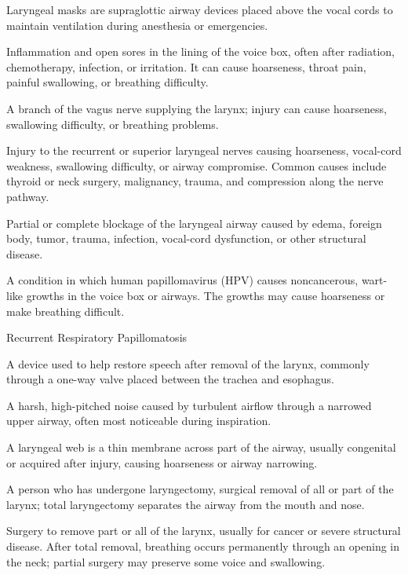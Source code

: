  Laryngeal masks are supraglottic airway devices placed above the vocal cords to maintain ventilation during anesthesia or emergencies.

 Inflammation and open sores in the lining of the voice box, often after radiation, chemotherapy, infection, or irritation. It can cause hoarseness, throat pain, painful swallowing, or breathing difficulty.

 A branch of the vagus nerve supplying the larynx; injury can cause hoarseness, swallowing difficulty, or breathing problems.

 Injury to the recurrent or superior laryngeal nerves causing hoarseness, vocal-cord
weakness, swallowing difficulty, or airway compromise. Common causes include thyroid or
neck surgery, malignancy, trauma, and compression along the nerve pathway.

 Partial or complete blockage of the laryngeal airway caused by edema, foreign body, tumor, trauma, infection, vocal-cord dysfunction, or other structural disease.

 A condition in which human papillomavirus (HPV) causes noncancerous, wart-like growths in the voice box or airways. The growths may cause hoarseness or make breathing difficult.

\synonyms
Recurrent Respiratory Papillomatosis

 A device used to help restore speech after removal of the larynx, commonly through a one-way valve placed between the trachea and esophagus.

 A harsh, high-pitched noise caused by turbulent airflow through a narrowed upper airway, often most noticeable during inspiration.

 A laryngeal web is a thin membrane across part of the airway, usually congenital or acquired after injury, causing hoarseness or airway narrowing.

 A person who has undergone laryngectomy, surgical removal of all or part of the larynx; total laryngectomy separates the airway from the mouth and nose.

 Surgery to remove part or all of the larynx, usually for cancer or severe structural disease. After total removal, breathing occurs permanently through an opening in the neck; partial surgery may preserve some voice and swallowing.


